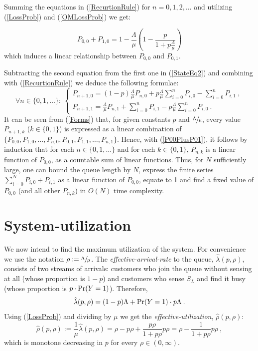 \documentclass[11pt]{article}
\numberwithin{equation}{section}
\newcommand{\pr}{{\rm Pr}}
\begin{document}
Summing the equations in (\ref{RecurtionRule}) for $n=0,1,2,\ldots$ and utilizing (\ref{LossProb}) and (\ref{OMLossProb}) we get:

\begin{equation}
	P_{0,0} + P_{1,0} = 1- \frac{ \Lambda}{ \mu}\left(1- \frac{p}{1+p \frac{\Lambda}{\mu}} \right) \label{P00PlusP01}
\end{equation}
which induces a linear relationship between $P_{0,0}$ and $P_{0,1}$.

Subtracting the second equation from the first one in (\ref{StateEq2}) and combining with (\ref{RecurtionRule}) we deduce the following formulae:
\begin{equation}
	\forall n \in \lbrace 0, 1, \ldots \rbrace: \
  	\begin{cases}
    	P_{n+1,0} = (1-p) \frac{\Lambda}{\mu} P_{n, 0} + p \frac{\Lambda}{\mu} \sum\limits_{i=0}^{n}P_{i,0} - \sum\limits_{i=0}^{n}P_{i,1}\:, \\
   	 	P_{n+1,1} = \frac{\Lambda}{\mu} P_{n, 1} + \sum\limits_{i=0}^{n}P_{i,1} - p \frac{\Lambda}{\mu} \sum\limits_{i=0}^{n}P_{i,0} \:.
  	\end{cases} \label{Forms}
\end{equation}
It can be seen from (\ref{Forms}) that, for given constants $p$ and $\sfrac{\Lambda}{\mu}$, every value $P_{n+1,k}$ ($k\in\lbrace0,1\rbrace$) is expressed as a linear combination of $\lbrace P_{0,0}, P_{1,0}, \ldots, P_{n,0}, P_{0,1}, P_{1,1}, \ldots, P_{n,1}  \rbrace$. Hence, with (\ref{P00PlusP01}), it follows by induction that for each $n \in \lbrace 0, 1, \ldots \rbrace$ and for each $k \in \lbrace 0, 1 \rbrace$, $P_{n,k}$ is a linear function of $P_{0,0}$, as a countable sum of linear functions. Thus, for $N$ sufficiently large, one can bound the queue length by $N$, express the finite series $\sum_{i=0}^{N} P_{i,0}+P_{i,1}$ as a linear function of $P_{0,0}$, equate to 1 and find a fixed value of $P_{0,0}$ (and all other $P_{n,k}$) in $O(N)$ time complexity.
\newpage

\section{System-utilization}
We now intend to find the maximum utilization of the system. For convenience we use the notation $\rho:=\sfrac{\Lambda}{\mu}$. The {\it effective-arrival-rate} to the queue, $\hat{\lambda}(p,\rho)$, consists of two streams of arrivals: customers who join the queue without sensing at all (whose proportion is $1-p$) and customers who sense $S_L$ and find it busy (whose proportion is $p \cdot \pr(Y=1)$). Therefore,
\[ \hat{\lambda}(p,\rho) = (1-p)\Lambda + \pr(Y=1)\cdot p \Lambda \:. \]
Using (\ref{LossProb}) and dividing by $\mu$ we get the {\it effective-utilization}, $\hat{\rho}(p,\rho)$:
\begin{equation}
\hat{\rho}(p,\rho) := \frac{1}{\mu}\hat{\lambda}(p,\rho) = \rho - p\rho + \frac{p\rho}{1+p\rho}p\rho = \rho - \frac{1}{1+p\rho}p\rho\:, \label{EffectiveUtil}
\end{equation}
which is monotone decreasing in $p$ for every $\rho\in(0,\infty)$. 
\end{document}
